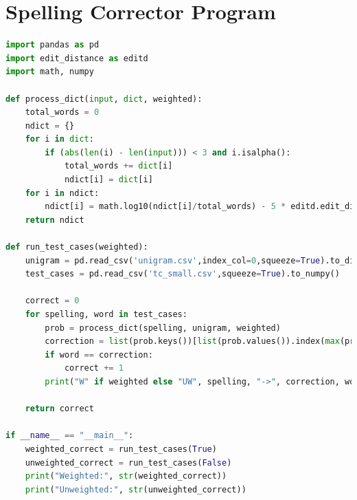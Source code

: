 \documentclass[12pt]{article}
\numberwithin{equation}{section}
\begin{document}
\chapter{Spelling Corrector Program}
\begin{lstlisting}[language=Python]
import pandas as pd
import edit_distance as editd
import math, numpy

def process_dict(input, dict, weighted):
    total_words = 0
    ndict = {}
    for i in dict:
        if (abs(len(i) - len(input))) < 3 and i.isalpha():
            total_words += dict[i]
            ndict[i] = dict[i]
    for i in ndict:
        ndict[i] = math.log10(ndict[i]/total_words) - 5 * editd.edit_distance(input, i, weighted)
    return ndict

def run_test_cases(weighted):
    unigram = pd.read_csv('unigram.csv',index_col=0,squeeze=True).to_dict()
    test_cases = pd.read_csv('tc_small.csv',squeeze=True).to_numpy()

    correct = 0
    for spelling, word in test_cases:
        prob = process_dict(spelling, unigram, weighted)
        correction = list(prob.keys())[list(prob.values()).index(max(prob.values()))]
        if word == correction:
            correct += 1
        print("W" if weighted else "UW", spelling, "->", correction, word, correct)

    return correct

if __name__ == "__main__":
    weighted_correct = run_test_cases(True)
    unweighted_correct = run_test_cases(False)
    print("Weighted:", str(weighted_correct))
    print("Unweighted:", str(unweighted_correct))
\end{lstlisting}
\end{document}
